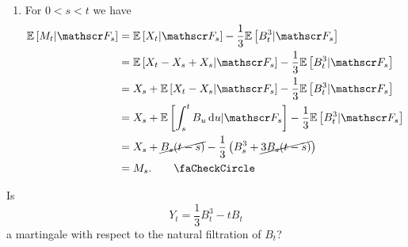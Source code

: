 \documentclass[12pt]{report}
\begin{document}
\begin{enumerate}
\begin{enumerate}
\begin{align*}
			&=\int_{0}^{t}\ev{B_{s}}\ds\quad\leftarrow\text{Fubini's theorem}\\
			&=0
		\end{align*}
		so
		\begin{equation*}
			\ev{M_{t}}=0-\frac{1}{3}\cdot 0=0<\infty.\tag*{\faCheckCircle}
		\end{equation*}
		\item For $0<s<t$ we have
		\begin{align*}
			\ev{M_{t}|\F_{s}}&=\ev{X_{t}|\F_{s}}-\frac{1}{3}\ev{B_{t}^{3}|\F_{s}}\\
			&=\ev{X_{t}-X_{s}+X_{s}|\F_{s}}-\frac{1}{3}\ev{B_{t}^{3}|\F_{s}}\\
			&=X_{s}+\ev{X_{t}-X_{s}|\F_{s}}-\frac{1}{3}\ev{B_{t}^{3}|\F_{s}}\\
			&=X_{s}+\ev{\int_{s}^{t}B_{u}\du|\F_{s}}-\frac{1}{3}\ev{B^{3}_{t}|\F_{s}}\\
			&=X_{s}+\cancel{B_{s}(t-s)}-{\frac{1}{3}}\left(B_{s}^{3}+\cancel{3B_{s}(t-s)}\right)\\
			&=M_{s}.\tag*{\faCheckCircle}
		\end{align*}
	\end{enumerate}
\end{enumerate}
\begin{exercise}
	Is 
	\begin{equation*}
		Y_{t}=\frac{1}{3}B_{t}^{3}-tB_{t}
	\end{equation*}
	a martingale with respect to the natural filtration of $B_{t}$?
\end{exercise}
\end{document}
